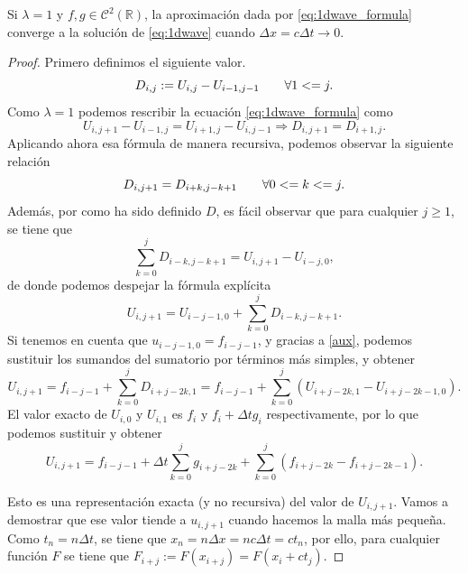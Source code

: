 \begin{teorema}
	Si $\lambda=1$ y $f,g\in\mathscr{C}^2(\mathbb{R})$, la aproximación dada por \eqref{eq:1dwave_formula} converge a la solución de \eqref{eq:1dwave} cuando $\Delta x = c\Delta t \longrightarrow 0$.
\end{teorema}
\begin{proof}
	Primero definimos el siguiente valor.
	\begin{equation}
		D_{i,j} := U_{i,j} - U_{i-1,j-1} \hspace{20px} \forall 1<=j.
	\end{equation}
	Como $\lambda = 1$ podemos rescribir la ecuación \eqref{eq:1dwave_formula} como 
	\begin{equation}
		U_{i,j+1} - U_{i-1,j} = U_{i+1,j} - U_{i,j-1} \Rightarrow D_{i,j+1} = D_{i+1,j}.
	\end{equation}
	Aplicando ahora esa fórmula de manera recursiva, podemos observar la siguiente relación
	\begin{equation}
		\label{aux}
		D_{i,j+1} = D_{i+k,j-k+1} \hspace{20px} \forall 0<=k<=j.
	\end{equation}
	Además, por como ha sido definido $D$, es fácil observar que para cualquier $j\geq1$, se tiene que
	\begin{equation}
		\sum_{k=0}^{j}D_{i-k,j-k+1} = U_{i,j+1} - U_{i-j,0},
	\end{equation}
	de donde podemos despejar la fórmula explícita
	\begin{equation}
		U_{i,j+1} = U_{i-j-1,0} + \sum_{k=0}^{j}D_{i-k,j-k+1}.
	\end{equation}
	Si tenemos en cuenta que $u_{i-j-1,0}=f_{i-j-1}$, y gracias a \eqref{aux}, podemos sustituir los sumandos del sumatorio por términos más simples, y obtener
	\begin{equation}
		U_{i,j+1} = f_{i-j-1} + \sum_{k=0}^{j}D_{i+j-2k,1} = f_{i-j-1} + \sum_{k=0}^{j}(U_{i+j-2k,1} - U_{i+j-2k-1,0}).
	\end{equation}
	El valor exacto de $U_{i,0}$ y $U_{i,1}$ es $f_{i}$ y $f_i+\Delta tg_i$ respectivamente, por lo que podemos sustituir y obtener
	\begin{equation}
		\label{aux2}
		U_{i,j+1} = f_{i-j-1} + \Delta t\sum_{k=0}^{j}g_{i+j-2k} + \sum_{k=0}^{j}(f_{i+j-2k}-f_{i+j-2k-1}).
	\end{equation}
	
	Esto es una representación exacta (y no recursiva) del valor de $U_{i,j+1}$. Vamos a demostrar que ese valor tiende a $u_{i,j+1}$ cuando hacemos la malla más pequeña.
	Como $t_n=n\Delta t$, se tiene que $x_n=n\Delta x=nc\Delta t=ct_{n}$, por ello, para cualquier función $F$ se tiene que $F_{i+j}:=F(x_{i+j})=F(x_i+ct_j)$.
	

\end{proof}
